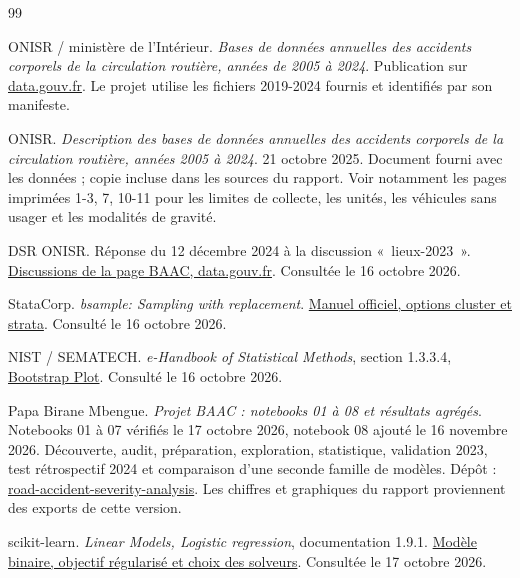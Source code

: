 \renewcommand{\bibname}{Références}
\begin{thebibliography}{99}

ONISR / ministère de l'Intérieur.
\textit{Bases de données annuelles des accidents corporels de la circulation routière,
années de 2005 à 2024}. Publication sur
\href{https://www.data.gouv.fr/datasets/bases-de-donnees-annuelles-des-accidents-corporels-de-la-circulation-routiere-annees-de-2005-a-2024}{data.gouv.fr}.
Le projet utilise les fichiers 2019-2024 fournis et identifiés par son manifeste.

ONISR. \textit{Description des bases de données annuelles des accidents corporels de la
circulation routière, années 2005 à 2024}. 21 octobre 2025.
Document fourni avec les données ; copie incluse dans les sources du rapport.
Voir notamment les pages imprimées 1-3, 7, 10-11 pour les limites de collecte,
les unités, les véhicules sans usager et les modalités de gravité.

DSR ONISR. Réponse du 12 décembre 2024 à la discussion «~lieux-2023~».
\href{https://www.data.gouv.fr/datasets/bases-de-donnees-annuelles-des-accidents-corporels-de-la-circulation-routiere-annees-de-2005-a-2024/discussions}{Discussions de la page BAAC, data.gouv.fr}.
Consultée le 16 octobre 2026.

StataCorp. \textit{bsample: Sampling with replacement}.
\href{https://www.stata.com/manuals/rbsample.pdf}{Manuel officiel, options cluster et strata}.
Consulté le 16 octobre 2026.

NIST / SEMATECH. \textit{e-Handbook of Statistical Methods}, section 1.3.3.4,
\href{https://itl.nist.gov/div898/handbook/eda/section3/eda334.htm}{Bootstrap Plot}.
Consulté le 16 octobre 2026.

Papa Birane Mbengue. \textit{Projet BAAC : notebooks 01 à 08 et résultats agrégés}.
Notebooks 01 à 07 vérifiés le 17 octobre 2026, notebook 08 ajouté le 16 novembre 2026.
Découverte, audit, préparation, exploration, statistique, validation 2023,
test rétrospectif 2024 et comparaison d'une seconde famille de modèles.
Dépôt : \href{https://github.com/birane-m/road-accident-severity-analysis}{road-accident-severity-analysis}.
Les chiffres et graphiques du rapport proviennent des exports de cette version.

scikit-learn. \textit{Linear Models, Logistic regression}, documentation 1.9.1.
\href{https://scikit-learn.org/stable/modules/linear_model.html#logistic-regression}{Modèle binaire, objectif régularisé et choix des solveurs}.
Consultée le 17 octobre 2026.


\end{thebibliography}
